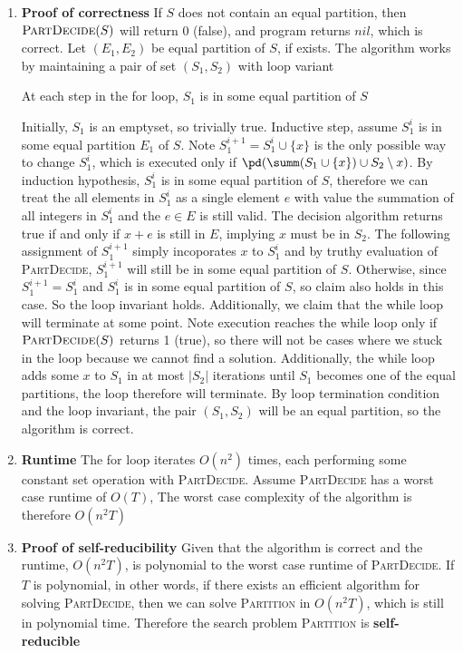 \documentclass[11pt]{article}
\begin{document}
\begin{enumerate}
\begin{solution}
\begin{enumerate}
            \item \textbf{Proof of correctness} If $S$ does not contain an equal partition, then $\textsc{PartDecide}(S)$ will return 0 (false), and program returns $nil$, which is correct. Let $(E_1, E_2)$ be equal partition of $S$, if exists. The algorithm works by maintaining a pair of set $(S_1, S_2)$ with loop variant
            \begin{center}
                At each step in the for loop, $S_1$ is in some equal partition of $S$
            \end{center}
            Initially, $S_1$ is an emptyset, so trivially true. Inductive step, assume $S_{1}^i$ is in some equal partition $E_1$ of $S$. Note $S_{1}^{i+1} = S_{1}^i \cup \{x \}$ is the only possible way to change $S_1^i$, which is executed only if $\pd(\summ(S_1 \cup \{ x\}) \cup S_2 \setminus x)$. By induction hypothesis, $S_1^i$ is in some equal partition of $S$, therefore we can treat the all elements in $S_1^i$ as a single element $e$ with value the summation of all integers in $S_1^i$ and the $e \in E$ is still valid. The decision algorithm returns true if and only if $x + e$ is still in $E$, implying $x$ must be in $S_2$. The following assignment of $S_1^{i+1}$ simply incoporates $x$ to $S_1^i$ and by truthy evaluation of \textsc{PartDecide}, $S_1^{i+1}$ will still be in some equal partition of $S$. Otherwise, since $S_1^{i+1} = S_1^i$ and $S_1^i$ is in some equal partition of $S$, so claim also holds in this case. So the loop invariant holds. Additionally, we claim that the while loop will terminate at some point. Note execution reaches the while loop only if $\textsc{PartDecide}(S)$ returns 1 (true), so there will not be cases where we stuck in the loop because we cannot find a solution. Additionally, the while loop adds some $x$ to $S_1$ in at most $|S_2|$ iterations until $S_1$ becomes one of the equal partitions, the loop therefore will terminate. By loop termination condition and the loop invariant, the pair $(S_1, S_2)$ will be an equal partition, so the algorithm is correct.  
            \item \textbf{Runtime} The for loop iterates $O(n^2)$ times, each performing some constant set operation with \textsc{PartDecide}. Assume \textsc{PartDecide} has a worst case runtime of $O(T)$, The worst case complexity of the algorithm is therefore $O(n^2T)$
            \item \textbf{Proof of self-reducibility}  Given that the algorithm is correct and the runtime, $O(n^2T)$, is polynomial to the worst case runtime of \textsc{PartDecide}. If $T$ is polynomial, in other words, if there exists an efficient algorithm for solving \textsc{PartDecide}, then we can solve \textsc{Partition} in $O(n^2T)$, which is still in polynomial time. Therefore the search problem \textsc{Partition} is \textbf{self-reducible} 
        \end{enumerate}
       
    \end{solution}
\end{enumerate}
\end{document}
